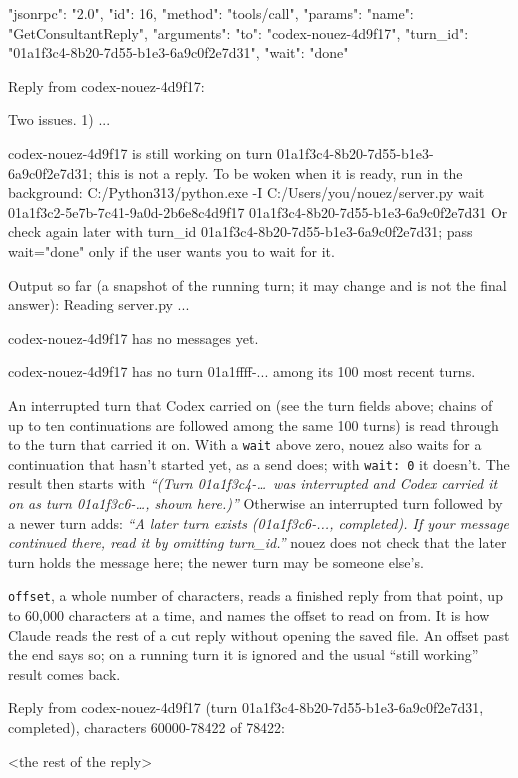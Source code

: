 \documentclass[10pt,a4paper]{article}
\newcommand{\code}[1]{\texttt{#1}}
\begin{document}
\begin{wire}[Request]
{"jsonrpc": "2.0", "id": 16, "method": "tools/call", "params": {"name": "GetConsultantReply",
  "arguments": {"to": "codex-nouez-4d9f17", "turn_id": "01a1f3c4-8b20-7d55-b1e3-6a9c0f2e7d31", "wait": "done"}}}
\end{wire}
\begin{plain}
Reply from codex-nouez-4d9f17:

Two issues. 1) ...

codex-nouez-4d9f17 is still working on turn 01a1f3c4-8b20-7d55-b1e3-6a9c0f2e7d31; this is not a reply. To be woken when it is ready, run in the background:
C:/Python313/python.exe -I C:/Users/you/nouez/server.py wait 01a1f3c2-5e7b-7c41-9a0d-2b6e8c4d9f17 01a1f3c4-8b20-7d55-b1e3-6a9c0f2e7d31
Or check again later with turn_id 01a1f3c4-8b20-7d55-b1e3-6a9c0f2e7d31; pass wait="done" only if the user wants you to wait for it.

Output so far (a snapshot of the running turn; it may change and is not the final answer):
Reading server.py ...

codex-nouez-4d9f17 has no messages yet.

codex-nouez-4d9f17 has no turn 01a1ffff-... among its 100 most recent turns.
\end{plain}

An interrupted turn that Codex carried on (see the turn fields above; chains of up to ten
continuations are followed among the same 100 turns) is read through to the turn that carried it
on. With a \code{wait} above zero, nouez also waits for a continuation that hasn't started yet,
as a send does; with \code{wait: 0} it doesn't. The result then starts with
\emph{``(Turn 01a1f3c4-\ldots\ was interrupted and Codex carried it on as turn 01a1f3c6-\ldots,
shown here.)''} Otherwise an interrupted turn followed by a newer turn adds:
\emph{``A later turn exists (01a1f3c6-..., completed). If your message continued there, read it
by omitting turn\_id.''} nouez does not check that the later turn holds the message here; the
newer turn may be someone else's.

\code{offset}, a whole number of characters, reads a finished reply from that point, up to 60,000
characters at a time, and names the offset to read on from. It is how Claude reads the rest of a
cut reply without opening the saved file. An offset past the end says so; on a running turn it is
ignored and the usual ``still working'' result comes back.
\begin{plain}[Result text: with \code{"offset": 60000}]
Reply from codex-nouez-4d9f17 (turn 01a1f3c4-8b20-7d55-b1e3-6a9c0f2e7d31, completed), characters 60000-78422 of 78422:

<the rest of the reply>
\end{plain}
\end{document}
